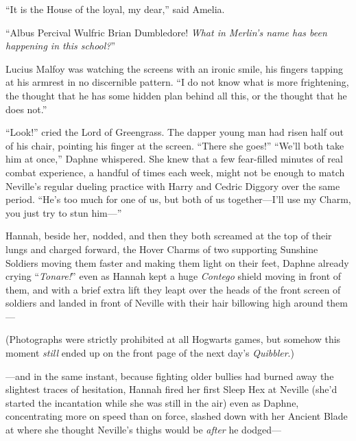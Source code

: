 “It is the House of the loyal, my dear,” said Amelia.

“Albus Percival Wulfric Brian Dumbledore! \emph{What in Merlin’s name has been
happening in this school?}”

Lucius Malfoy was watching the screens with an ironic smile, his fingers
tapping at his armrest in no discernible pattern. “I do not know what is more
frightening, the thought that he has some hidden plan behind all this, or the
thought that he does not.”

“Look!” cried the Lord of Greengrass. The dapper young man had risen half out
of his chair, pointing his finger at the screen. “There she goes!”
\later
“We’ll both take him at once,” Daphne whispered. She knew that a few
fear-filled minutes of real combat experience, a handful of times each week,
might not be enough to match Neville’s regular dueling practice with Harry and
Cedric Diggory over the same period. “He’s too much for one of us, but both of
us together—I’ll use my Charm, you just try to stun him—”

Hannah, beside her, nodded, and then they both screamed at the top of their
lungs and charged forward, the Hover Charms of two supporting Sunshine Soldiers
moving them faster and making them light on their feet, Daphne already crying
“\emph{Tonare!}” even as Hannah kept a huge \emph{Contego} shield moving in
front of them, and with a brief extra lift they leapt over the heads of the
front screen of soldiers and landed in front of Neville with their hair
billowing high around them—

(Photographs were strictly prohibited at all Hogwarts games, but somehow this
moment \emph{still} ended up on the front page of the next day’s
\emph{Quibbler}.)

—and in the same instant, because fighting older bullies had burned away the
slightest traces of hesitation, Hannah fired her first Sleep Hex at Neville
(she’d started the incantation while she was still in the air) even as Daphne,
concentrating more on speed than on force, slashed down with her Ancient Blade
at where she thought Neville’s thighs would be \emph{after} he dodged—

